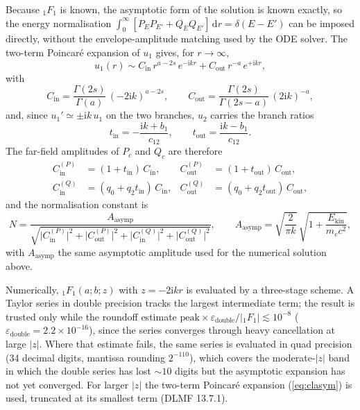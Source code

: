 \documentclass[11pt,a4paper]{article}
\newcommand{\dif}{\mathrm{d}}
\newcommand{\iu}{\mathrm{i}}
\begin{document}
Because ${}_{1}F_{1}$ is known, the asymptotic form of the solution is
known exactly, so the energy normalisation
$\int_{0}^{\infty}[P_{E}P_{E'}+Q_{E}Q_{E'}]\,\dif r=\delta(E-E')$ can be
imposed directly, without the envelope-amplitude matching used by the ODE
solver.  The two-term Poincaré expansion of $u_{1}$ gives, for
$r\to\infty$,
\begin{equation}
  u_{1}(r) \sim C_{\mathrm{in}}\,r^{a-2s}\,e^{-\iu kr}
            + C_{\mathrm{out}}\,r^{-a}\,e^{+\iu kr},
  \label{eq:clasym}
\end{equation}
with
\begin{equation}
  C_{\mathrm{in}}  = \frac{\Gamma(2s)}{\Gamma(a)}\,(-2\iu k)^{a-2s},\qquad
  C_{\mathrm{out}} = \frac{\Gamma(2s)}{\Gamma(2s-a)}\,(2\iu k)^{-a},
  \label{eq:clC}
\end{equation}
and, since $u_{1}'\simeq\pm\iu k\,u_{1}$ on the two branches, $u_{2}$ carries
the branch ratios
\begin{equation}
  t_{\mathrm{in}} = -\frac{\iu k + b_{1}}{c_{12}},\qquad
  t_{\mathrm{out}} = \frac{\iu k - b_{1}}{c_{12}}.
  \label{eq:clt}
\end{equation}
The far-field amplitudes of $P_{c}$ and $Q_{c}$ are therefore
\begin{align}
  C_{\mathrm{in}}^{(P)} &= (1+t_{\mathrm{in}})\,C_{\mathrm{in}},
    & C_{\mathrm{out}}^{(P)} &= (1+t_{\mathrm{out}})\,C_{\mathrm{out}},\\
  C_{\mathrm{in}}^{(Q)} &= (q_{0}+q_{2}t_{\mathrm{in}})\,C_{\mathrm{in}},
    & C_{\mathrm{out}}^{(Q)} &= (q_{0}+q_{2}t_{\mathrm{out}})\,C_{\mathrm{out}},
\end{align}
and the normalisation constant is
\begin{equation}
  N = \frac{A_{\mathrm{asymp}}}{
    \sqrt{\bigl|C_{\mathrm{in}}^{(P)}\bigr|^{2}
         +\bigl|C_{\mathrm{out}}^{(P)}\bigr|^{2}
         +\bigl|C_{\mathrm{in}}^{(Q)}\bigr|^{2}
         +\bigl|C_{\mathrm{out}}^{(Q)}\bigr|^{2}}},
  \qquad
  A_{\mathrm{asymp}} = \sqrt{\frac{2}{\pi k}}\,
    \sqrt{1+\frac{E_{\mathrm{kin}}}{m_{e}c^{2}}},
  \label{eq:clN}
\end{equation}
with $A_{\mathrm{asymp}}$ the same asymptotic amplitude used for the
numerical solution above.

Numerically, ${}_{1}F_{1}(a;b;z)$ with $z=-2\iu kr$ is evaluated by a
three-stage scheme.  A Taylor series in double precision tracks the largest
intermediate term; the result is trusted only while the roundoff estimate
$\mathrm{peak}\times\varepsilon_{\mathrm{double}}/|{}_{1}F_{1}|\lesssim
10^{-8}$ ($\varepsilon_{\mathrm{double}}=2.2\times10^{-16}$), since the
series converges through heavy cancellation at large $|z|$.  Where that
estimate fails, the same series is evaluated in quad precision (34 decimal
digits, mantissa rounding $2^{-110}$), which covers the moderate-$|z|$ band
in which the double series has lost $\sim10$ digits but the asymptotic
expansion has not yet converged.  For larger $|z|$ the two-term Poincaré
expansion (\ref{eq:clasym}) is used, truncated at its smallest term
(DLMF 13.7.1).
\end{document}

